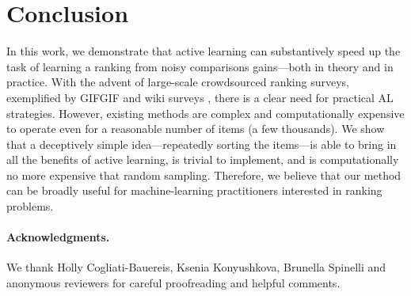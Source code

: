 \section{Conclusion}  %
\label{sec:conclusion}

In this work, we demonstrate that active learning can substantively speed up the task of learning a ranking from noisy comparisons gains---both in theory and in practice.
With the advent of large-scale crowdsourced ranking surveys, exemplified by GIFGIF and wiki surveys \citep{salganik2015wiki}, there is a clear need for practical AL strategies.
However, existing methods are complex and computationally expensive to operate even for a reasonable number of items (a few thousands).
We show that a deceptively simple idea---repeatedly sorting the items---is able to bring in all the benefits of active learning, is trivial to implement, and is computationally no more expensive that random sampling.
Therefore, we believe that our method can be broadly useful for machine-learning practitioners interested in ranking problems.

\paragraph{Acknowledgments.}
We thank Holly Cogliati-Bauereis, Ksenia Konyushkova, Brunella Spinelli and anonymous reviewers for careful proofreading and helpful comments.
